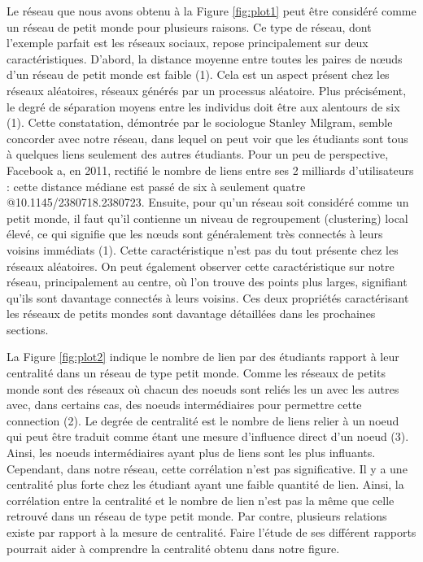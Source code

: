 \documentclass[9pt,twocolumn,twoside,]{pnas-new}
\begin{document}
Le réseau que nous avons obtenu à la Figure \ref{fig:plot1} peut être
considéré comme un réseau de petit monde pour plusieurs raisons. Ce type
de réseau, dont l'exemple parfait est les réseaux sociaux, repose
principalement sur deux caractéristiques. D'abord, la distance moyenne
entre toutes les paires de nœuds d'un réseau de petit monde est faible
(1). Cela est un aspect présent chez les réseaux aléatoires, réseaux
générés par un processus aléatoire. Plus précisément, le degré de
séparation moyens entre les individus doit être aux alentours de six
(1). Cette constatation, démontrée par le sociologue Stanley Milgram,
semble concorder avec notre réseau, dans lequel on peut voir que les
étudiants sont tous à quelques liens seulement des autres étudiants.
Pour un peu de perspective, Facebook a, en 2011, rectifié le nombre de
liens entre ses 2 milliards d'utilisateurs : cette distance médiane est
passé de six à seulement quatre @10.1145/2380718.2380723. Ensuite, pour
qu'un réseau soit considéré comme un petit monde, il faut qu'il
contienne un niveau de regroupement (clustering) local élevé, ce qui
signifie que les nœuds sont généralement très connectés à leurs voisins
immédiats (1). Cette caractéristique n'est pas du tout présente chez les
réseaux aléatoires. On peut également observer cette caractéristique sur
notre réseau, principalement au centre, où l'on trouve des points plus
larges, signifiant qu'ils sont davantage connectés à leurs voisins. Ces
deux propriétés caractérisant les réseaux de petits mondes sont
davantage détaillées dans les prochaines sections.

La Figure \ref{fig:plot2} indique le nombre de lien par des étudiants
rapport à leur centralité dans un réseau de type petit monde. Comme les
réseaux de petits monde sont des réseaux où chacun des noeuds sont
reliés les un avec les autres avec, dans certains cas, des noeuds
intermédiaires pour permettre cette connection (2). Le degrée de
centralité est le nombre de liens relier à un noeud qui peut être
traduit comme étant une mesure d'influence direct d'un noeud (3). Ainsi,
les noeuds intermédiaires ayant plus de liens sont les plus influants.
Cependant, dans notre réseau, cette corrélation n'est pas significative.
Il y a une centralité plus forte chez les étudiant ayant une faible
quantité de lien. Ainsi, la corrélation entre la centralité et le nombre
de lien n'est pas la même que celle retrouvé dans un réseau de type
petit monde. Par contre, plusieurs relations existe par rapport à la
mesure de centralité. Faire l'étude de ses différent rapports pourrait
aider à comprendre la centralité obtenu dans notre figure.
\end{document}
